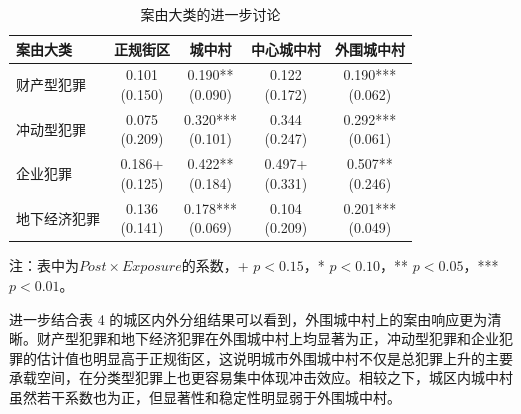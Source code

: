 \documentclass[a4paper,12pt]{report}
\begin{document}
\begin{table}[H]
\centering
\caption{案由大类的进一步讨论}
\label{tab:hetero_4cat}
\begin{tabular*}{\textwidth}{@{\extracolsep{\fill}}lcccc}
\toprule
案由大类 & 正规街区 & 城中村 & 中心城中村 & 外围城中村 \\
\midrule
财产型犯罪 & \makecell{0.101\\(0.150)} & \makecell{0.190**\\(0.090)} & \makecell{0.122\\(0.172)} & \makecell{0.190***\\(0.062)} \\
冲动型犯罪 & \makecell{0.075\\(0.209)} & \makecell{0.320***\\(0.101)} & \makecell{0.344\\(0.247)} & \makecell{0.292***\\(0.061)} \\
企业犯罪 & \makecell{0.186+\\(0.125)} & \makecell{0.422**\\(0.184)} & \makecell{0.497+\\(0.331)} & \makecell{0.507**\\(0.246)} \\
地下经济犯罪 & \makecell{0.136\\(0.141)} & \makecell{0.178***\\(0.069)} & \makecell{0.104\\(0.209)} & \makecell{0.201***\\(0.049)} \\
\bottomrule
\end{tabular*}
\vspace{0.15cm}

\par\raggedright{} 注：表中为$Post\times Exposure$的系数，+ $p<0.15$，* $p<0.10$，** $p<0.05$，*** $p<0.01$。
\end{table}

进一步结合表 4 的城区内外分组结果可以看到，外围城中村上的案由响应更为清晰。财产型犯罪和地下经济犯罪在外围城中村上均显著为正，冲动型犯罪和企业犯罪的估计值也明显高于正规街区，这说明城市外围城中村不仅是总犯罪上升的主要承载空间，在分类型犯罪上也更容易集中体现冲击效应。相较之下，城区内城中村虽然若干系数也为正，但显著性和稳定性明显弱于外围城中村。
\end{document}
